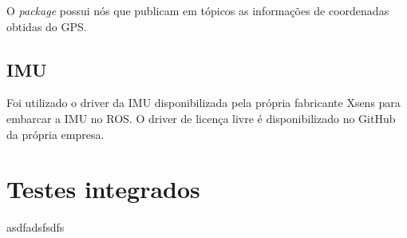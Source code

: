      O \textit{package} possui nós que publicam em tópicos as informações de coordenadas obtidas do GPS.
     
     \subsection{IMU}
    Foi utilizado o driver da IMU disponibilizada pela própria fabricante Xsens para embarcar a IMU no ROS. O driver de licença livre é disponibilizado no GitHub da própria empresa.
\section{Testes integrados}
\label{sec:testi}
asdfadsfsdfs

%
%
%
%
